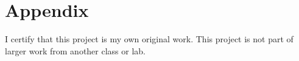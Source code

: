 \documentclass[10pt,twocolumn,letterpaper]{article}
\begin{document}




{\small


}

\section{Appendix}
I certify that this project is my own original work. This project is not part of larger work from another class or lab.

\end{document}
